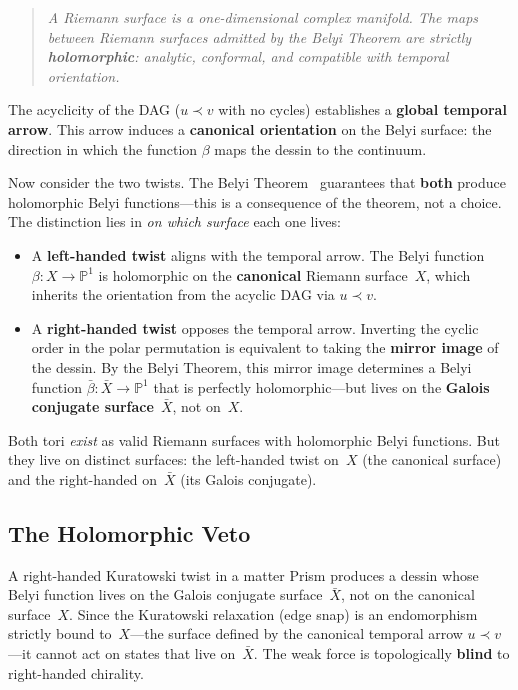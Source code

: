 \begin{quote}
\itshape
A Riemann surface is a one-dimensional complex manifold.
The maps between Riemann surfaces admitted by the
Belyi Theorem are strictly \textbf{holomorphic}: analytic,
conformal, and compatible with temporal orientation.
\end{quote}

The acyclicity of the DAG ($u \prec v$ with no cycles) establishes a
\textbf{global temporal arrow}. This arrow induces a
\textbf{canonical orientation} on the Belyi surface: the
direction in which the function $\beta$ maps the dessin to the
continuum.

Now consider the two twists. The Belyi
Theorem~\cite{belyi1979} guarantees that \textbf{both} produce
holomorphic Belyi functions---this is a consequence of the theorem, not a
choice. The distinction lies in \emph{on which surface}
each one lives:

\begin{itemize}
  \item A \textbf{left-handed twist} aligns with the temporal arrow.
    The Belyi function $\beta \colon X \to \mathbb{P}^1$ is holomorphic
    on the \textbf{canonical} Riemann surface~$X$, which inherits
    the orientation from the acyclic DAG via $u \prec v$.
  \item A \textbf{right-handed twist} opposes the temporal arrow.
    Inverting the cyclic order in the polar permutation is equivalent to
    taking the \textbf{mirror image} of the dessin. By the Belyi
    Theorem, this mirror image determines a Belyi function
    $\bar{\beta} \colon \bar{X} \to \mathbb{P}^1$ that is perfectly
    holomorphic---but lives on the \textbf{Galois conjugate
    surface}~$\bar{X}$, not on~$X$.
\end{itemize}

\noindent
Both tori \emph{exist} as valid Riemann surfaces with
holomorphic Belyi functions. But they live on distinct surfaces:
the left-handed twist on~$X$ (the canonical surface) and the
right-handed on~$\bar{X}$ (its Galois conjugate).

\subsection{The Holomorphic Veto}

\begin{theorem}
\label{thm:parity-veto}
A right-handed Kuratowski twist in a matter Prism produces a
dessin whose Belyi function lives on the Galois conjugate
surface~$\bar{X}$, not on the canonical surface~$X$. Since the
Kuratowski relaxation (edge snap) is an endomorphism
strictly bound to~$X$---the surface defined by the canonical
temporal arrow $u \prec v$---it cannot act on states that
live on~$\bar{X}$. The weak force is topologically
\textbf{blind} to right-handed chirality.
\end{theorem}

